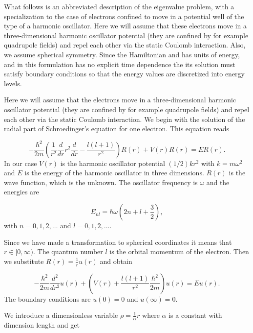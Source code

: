 \documentclass[10pt,showpacs,preprintnumbers,footinbib,amsmath,amssymb,aps,prl,twocolumn,groupedaddress,superscriptaddress,showkeys]{revtex4-1}
\begin{document}
What follows is an abbreviated description of the eigenvalue problem, with a specialization to the case of electrons confined to move in a potential well of the type of a harmonic oscillator.  Here we will assume that these electrons move in a three-dimensional harmonic oscillator potential (they are confined by for example quadrupole fields) and repel  each other via the static Coulomb interaction.  
Also, we assume spherical symmetry.  Since the Hamiltonian and has units of energy, and in this formulation has no explicit time dependence the its solution must satisfy boundary conditions so that the energy values are discretized into energy levels. 

Here we will assume that the electrons move in a three-dimensional harmonic
oscillator potential (they are confined by for example quadrupole fields)
and repel  each other via the static Coulomb interaction.  We begin with the solution of the radial part of Schroedinger's equation for one electron. This equation reads

\begin{equation*}
  -\frac{\hbar^2}{2 m} \left ( \frac{1}{r^2} \frac{d}{dr} r^2
  \frac{d}{dr} - \frac{l (l + 1)}{r^2} \right )R(r) 
     + V(r) R(r) = E R(r).
\end{equation*}
In our case $V(r)$ is the harmonic oscillator potential $(1/2)kr^2$ with
$k=m\omega^2$ and $E$ is the energy of the harmonic oscillator in three dimensions. $R(r)$ is the wave function, which is the unknown. The oscillator frequency is $\omega$ and the energies are

\begin{equation*}
E_{nl}=  \hbar \omega \left(2n+l+\frac{3}{2}\right),
\end{equation*}
with $n=0,1,2,\dots$ and $l=0,1,2,\dots$.

Since we have made a transformation to spherical coordinates it means that 
$r\in [0,\infty)$.  
The quantum number $l$ is the orbital momentum of the electron.  
% 
Then we substitute $R(r) = \frac{1}{r} u(r)$ and obtain
% 

\begin{equation*}
  -\frac{\hbar^2}{2 m} \frac{d^2}{dr^2} u(r) 
       + \left ( V(r) + \frac{l (l + 1)}{r^2}\frac{\hbar^2}{2 m}
                                    \right ) u(r)  = E u(r) .
\end{equation*}
% 
The boundary conditions are $u(0)=0$ and $u(\infty)=0$.

We introduce a dimensionless variable $\rho = \frac{1}{\alpha} r$
where $\alpha$ is a constant with dimension length and get
% 
\end{document}
